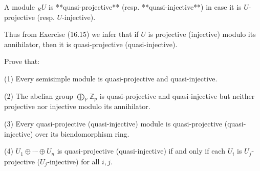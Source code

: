 A module ${}_R U$ is **quasi-projective** (resp. **quasi-injective**) in case it is $U$-projective (resp. $U$-injective).

Thus from Exercise (16.15) we infer that if $U$ is projective (injective) modulo its annihilator, then it is quasi-projective (quasi-injective).

Prove that:

(1) Every semisimple module is quasi-projective and quasi-injective.

(2) The abelian group $\bigoplus_{\mathbb{P}} \mathbb{Z}_p$ is quasi-projective and quasi-injective but neither projective nor injective modulo its annihilator.

(3) Every quasi-projective (quasi-injective) module is quasi-projective (quasi-injective) over its biendomorphism ring.

(4) $U_1 \oplus \cdots \oplus U_n$ is quasi-projective (quasi-injective) if and only if each $U_i$ is $U_j$-projective ($U_j$-injective) for all $i, j$.
